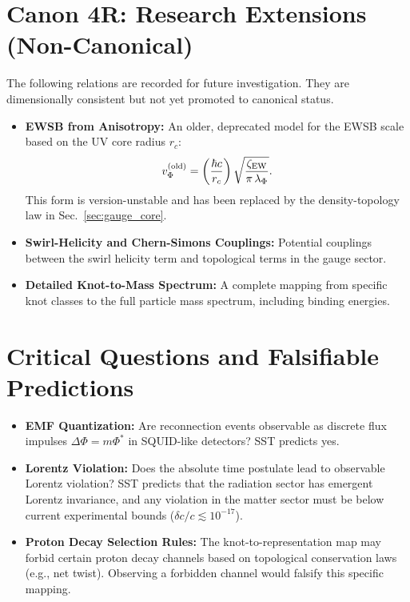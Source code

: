 \documentclass[11pt]{article}
\newcommand{\rc}{r_c}                                    %
\begin{document}
    \appendix
\section{Canon 4R: Research Extensions (Non-Canonical)}
The following relations are recorded for future investigation. They are dimensionally consistent but not yet promoted to canonical status.
\begin{itemize}
\item \textbf{EWSB from Anisotropy:} An older, deprecated model for the EWSB scale based on the UV core radius $\rc$:
\[ v_\Phi^{(\text{old})} = \left(\frac{\hbar c}{\rc}\right) \sqrt{\frac{\zeta_{\rm EW}}{\pi\,\lambda_\Phi}}. \]
This form is version-unstable and has been replaced by the density-topology law in Sec.~\ref{sec:gauge_core}.
\item \textbf{Swirl-Helicity and Chern-Simons Couplings:} Potential couplings between the swirl helicity term and topological terms in the gauge sector.
\item \textbf{Detailed Knot-to-Mass Spectrum:} A complete mapping from specific knot classes to the full particle mass spectrum, including binding energies.
\end{itemize}

\section{Critical Questions and Falsifiable Predictions}
\begin{itemize}
\item \textbf{EMF Quantization:} Are reconnection events observable as discrete flux impulses $\Delta\Phi = m \Phi^*$ in SQUID-like detectors? SST predicts yes.
\item \textbf{Lorentz Violation:} Does the absolute time postulate lead to observable Lorentz violation? SST predicts that the radiation sector has emergent Lorentz invariance, and any violation in the matter sector must be below current experimental bounds ($\delta c/c \lesssim 10^{-17}$).
\item \textbf{Proton Decay Selection Rules:} The knot-to-representation map may forbid certain proton decay channels based on topological conservation laws (e.g., net twist). Observing a forbidden channel would falsify this specific mapping.
\end{itemize}
\end{document}
